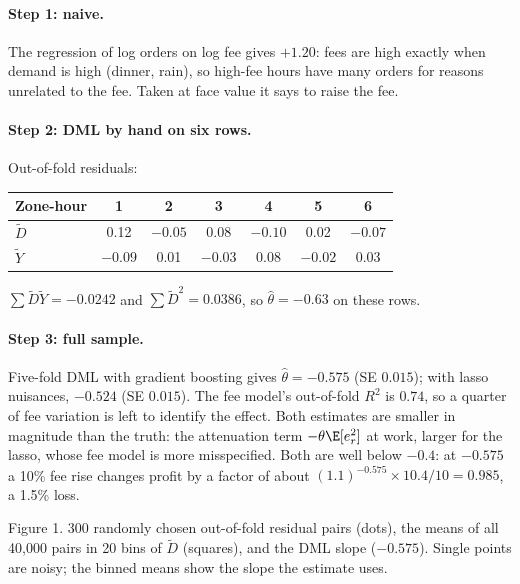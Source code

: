 \documentclass[11pt]{article}
\begin{document}
\paragraph{Step 1: naive.} The regression of log orders on log fee gives $+1.20$: fees are high exactly when demand is high (dinner,
rain), so high-fee hours have many orders for reasons unrelated to the fee. Taken at face value it says to raise the fee.

\paragraph{Step 2: DML by hand on six rows.} Out-of-fold residuals:
\begin{center}
\begin{tabular}{lcccccc}
\toprule
Zone-hour & 1 & 2 & 3 & 4 & 5 & 6 \\
\midrule
$\tilde D$ & 0.12 & $-0.05$ & 0.08 & $-0.10$ & 0.02 & $-0.07$ \\
$\tilde Y$ & $-0.09$ & 0.01 & $-0.03$ & 0.08 & $-0.02$ & 0.03 \\
\bottomrule
\end{tabular}
\end{center}
$\sum\tilde D\tilde Y = -0.0242$ and $\sum\tilde D^2 = 0.0386$, so $\hat\theta = -0.63$ on these rows.

\paragraph{Step 3: full sample.} Five-fold DML with gradient boosting gives $\hat\theta = -0.575$ (SE $0.015$); with lasso nuisances, $-0.524$
(SE $0.015$). The fee model's out-of-fold $R^2$ is $0.74$, so a quarter of fee variation is left to identify the effect. Both estimates are
smaller in magnitude than the truth: the attenuation term $-\theta\E[e_r^2]$ at work, larger for the lasso, whose fee model is more misspecified. Both are
well below $-0.4$: at $-0.575$ a 10\% fee rise changes profit by a factor of about $(1.1)^{-0.575} \times 10.4/10 = 0.985$, a 1.5\% loss.

\begin{center}

\small Figure 1. 300 randomly chosen out-of-fold residual pairs (dots), the means of all 40{,}000 pairs in 20 bins of $\tilde D$ (squares),
and the DML slope ($-0.575$). Single points are noisy; the binned means show the slope the estimate uses.
\end{center}
\end{document}
